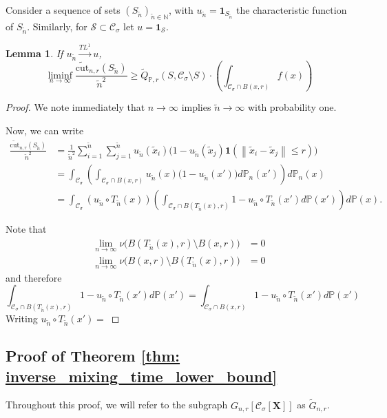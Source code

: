 \documentclass{article}
\newcommand{\norm}[1]{\left\lVert#1\right\rVert}
\newcommand{\1}{\mathbf{1}}
\newcommand{\cut}{\mathrm{cut}}
\newcommand{\Xbf}{\mathbf{X}}
\newcommand{\Pbb}{\mathbb{P}}
\newcommand{\Sset}{\mathcal{S}}
\newcommand{\Cset}{\mathcal{C}}
\newcommand{\Csig}{\Cset_{\sigma}}
\newcommand{\wn}{\widetilde{n}}
\newcommand{\wx}{\widetilde{x}}
\theoremstyle{aldenthm}
\newtheorem{lemma}{Lemma}
\begin{document}
Consider a sequence of sets $(S_{\wn})_{\wn \in \mathbb{N}}$, with $u_{\wn} = \1_{S_{\wn}}$ the characteristic function of $S_{\wn}$. Similarly, for $\Sset \subset \Csig$ let $u = \1_{\Sset}$. 
\begin{lemma}
	If $u_{\wn} \overset{TL^1}{\to} u$,
	\begin{equation*}
	\liminf_{n \to \infty} \frac{\widetilde{\cut}_{n,r}(S_{\wn})}{\wn^2} \geq \widetilde{Q}_{\Pbb,r}(S, \Csig \setminus S) \cdot \left(\int_{\Csig \cap B(x,r)} f(x) \right)
	\end{equation*}
\end{lemma}
\begin{proof}
	We note immediately that $n \to \infty$ implies $\wn \to \infty$ with probability one.
	
	Now, we can write
	\begin{align*}
	 \frac{\widetilde{\cut}_{n,r}(S_{\wn})}{\wn^2} & = \frac{1}{\wn^2} \sum_{i = 1}^{\wn} \sum_{j = 1}^{\wn} u_{\wn}(\wx_i) \bigl( 1 - u_{\wn}(\wx_j) \1(\norm{\wx_i - \wx_j} \leq r) \bigr)  \\
	& = \int_{\Csig} \left(\int_{\Csig \cap B(x,r)} u_{\wn}(x) \bigl( 1 - u_{\wn}(x') \bigr) d\Pbb_n(x') \right) d\Pbb_n(x) \\
	& = \int_{\Csig} \left(u_{\wn} \circ T_{\wn}(x)\right) \left(\int_{\Csig \cap B(T_{\wn}(x),r)}  1 - u_{\wn} \circ T_{\wn}(x') d\Pbb(x') \right) d\Pbb(x).
	\end{align*}
	
	Note that
	\begin{align*}
	\lim_{n \to \infty} \nu\bigl(B(T_{\wn}(x),r) \setminus B(x,r)\bigr) & = 0 \\
	\lim_{n \to \infty} \nu\bigl(B(x,r) \setminus B(T_{\wn}(x),r)\bigr) & = 0
	\end{align*}
	and therefore 
	\begin{equation*}
	\int_{\Csig \cap B(T_{\wn}(x),r)}  1 - u_{\wn} \circ T_{\wn}(x') d\Pbb(x') = \int_{\Csig \cap B(x,r)}  1 - u_{\wn} \circ T_{\wn}(x') d\Pbb(x')
	\end{equation*}
	Writing $u_{\wn} \circ T_{\wn}(x') = $
\end{proof}








\subsection{Proof of Theorem \ref{thm: inverse_mixing_time_lower_bound}}
Throughout this proof, we will refer to the subgraph $G_{n,r}\left[\Csig[\Xbf]\right]$ as $\widetilde{G}_{n,r}$.
\end{document}
